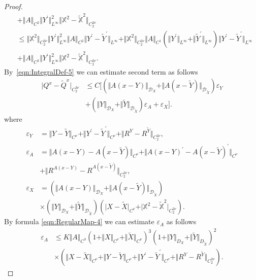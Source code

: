 \documentclass[11pt,a4paper,reqno]{amsart}%
\theoremstyle{plain}
\theoremstyle{remark}
\theoremstyle{plain}
\numberwithin{equation}{section}
\newcommand{\eps}{\varepsilon}
\begin{document}
\begin{proof}
\begin{equation}
\begin{split}
&+ \Vert A\Vert_{C^2}\Vert Y^\prime\Vert_{L^{\infty}}^2\Vert \mathbb{X}^2-\mathbb{\tilde{X}}^2\Vert_{C_2^{2\nu}}\\
&\leq
\Vert \mathbb{X}^2\Vert_{C_2^{2\nu}}\Vert Y^\prime\Vert_{L^{\infty}}^2\Vert A\Vert_{C^2}\Vert Y^\prime-\tilde{Y}^\prime\Vert_{L^{\infty}}
+\Vert \mathbb{X}^2\Vert_{C_2^{2\nu}}\Vert A\Vert_{C^1}(\Vert Y^\prime\Vert_{L^{\infty}}+\Vert \tilde{Y}^\prime\Vert_{L^{\infty}})\Vert Y^\prime-\tilde{Y}^\prime\Vert_{L^{\infty}}\\
&+\Vert A\Vert_{C^2}\Vert Y^\prime\Vert_{L^{\infty}}^2\Vert \mathbb{X}^2-\mathbb{\tilde{X}}^2\Vert_{C_2^{2\nu}}.
\end{split}
\end{equation}
By~\eqref{eqn:IntegralDef-5} we can estimate second term as
follows
\begin{equation}
\label{eqn:PRaux-3}
\begin{aligned}
\vert Q^x-\tilde{Q}^x\vert_{C_2^{3\nu}}&\leq
C\Big[(\Vert A(x-Y)\Vert_{\mathcal{D}_X}+\Vert A(x-\tilde{Y})\Vert_{\mathcal{D}_{\tilde{X}}})\eps_Y\nonumber\\&+
(\Vert Y\Vert_{\mathcal{D}_X}+\Vert \tilde{Y}\Vert_{\mathcal{D}_{\tilde{X}}})\eps_A+\eps_X\Big].
\end{aligned}
\end{equation}
where
\begin{align*}
\eps_Y&=\Vert Y-\tilde{Y}\Vert_{C^{\nu}}+\Vert Y^\prime-\tilde{Y}^\prime\Vert_{C^{\nu}}+\Vert R^Y-R^{\tilde{Y}}\Vert_{C_2^{2\nu}},\\
\eps_A&=\Vert A(x-Y)-A(x-\tilde{Y})\Vert_{C^{\nu}}+\Vert A(x-Y)^\prime-A(x-\tilde{Y})^\prime\Vert_{C^{\nu}}\\
&+\Vert R^{A(x-Y)}-R^{A(x-\tilde{Y})}\Vert_{C_2^{2\nu}},\\
\eps_X&=(\Vert A(x-Y)\Vert_{\mathcal{D}_X}+\Vert A(x-\tilde{Y})\Vert_{\mathcal{D}_{\tilde{X}}})\\
&\times(\Vert Y\Vert_{\mathcal{D}_X}+\Vert \tilde{Y}\Vert_{\mathcal{D}_{\tilde{X}}})
(\vert X-\tilde{X}\vert_{C^{\nu}}+\vert \mathbb{X}^2-\mathbb{\tilde{X}}^2\vert_{C_2^{2\nu}}).
\end{align*}
By formula \eqref{eqn:RegularMap-4} we can estimate $\eps_A$ as
follows
\begin{align}
 \eps_A &\leq
K\Vert A\Vert_{C^3}(1+\Vert X\Vert_{C^{\nu}}+\Vert \tilde{X}\Vert_{C^{\nu}})^3(1+\Vert Y\Vert_{D_X}+\Vert \tilde{Y}\Vert_{D_{\tilde{X}}})^2\nonumber\\
&\times(\Vert X-\tilde{X}\Vert_{C^{\nu}}+\Vert Y-\tilde{Y}\Vert_{C^{\nu}}+\Vert Y^\prime-\tilde{Y}^\prime\Vert_{C^{\nu}}+\Vert R^Y-R^{\tilde{Y}}\Vert_{C_2^{2\nu}}).\label{eqn:PRaux-4}

\end{align}
\end{proof}
\end{document}
